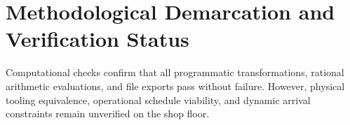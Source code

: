 \section{Methodological Demarcation and Verification Status}
\label{sec:verification_status}



Computational checks confirm that all programmatic transformations, rational arithmetic evaluations, and file exports pass without failure. However, physical tooling equivalence, operational schedule viability, and dynamic arrival constraints remain unverified on the shop floor.
